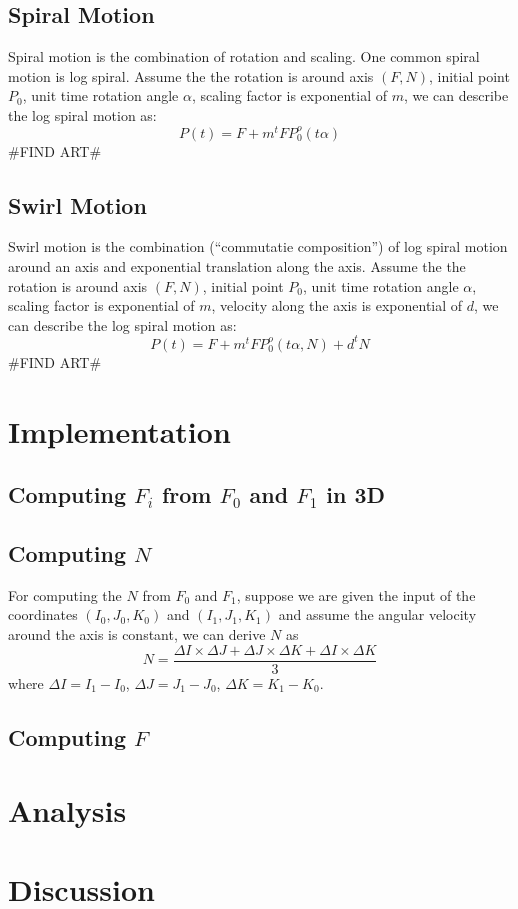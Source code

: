 \documentclass[twoside,11pt]{article}
\begin{document}
\subsection{Spiral Motion}
Spiral motion is the combination of rotation and scaling. One common spiral motion is log spiral. Assume the the rotation is around axis $(F, N)$, initial point $P_0$, unit time rotation angle $\alpha$, scaling factor is exponential of $m$, we can describe the log spiral motion as:
\begin{equation}
P(t) = F + m^t FP_0^o(t\alpha)
\end{equation}
\#FIND ART\#

\subsection{Swirl Motion}
Swirl motion is the combination (``commutatie composition'') of log spiral motion around an axis and exponential translation along the axis. Assume the the rotation is around axis $(F, N)$, initial point $P_0$, unit time rotation angle $\alpha$, scaling factor is exponential of $m$, velocity along the axis is exponential of $d$, we can describe the log spiral motion as:
\begin{equation}
P(t) = F + m^t FP_0^o(t\alpha, N) + d^t N
\end{equation}
\#FIND ART\#

\section{Implementation}

\subsection{Computing $F_i$ from $F_0$ and $F_1$ in 3D}


\subsection{Computing $N$}

For computing the $N$ from $F_0$ and $F_1$, suppose we are given the input of the coordinates $(I_0, J_0, K_0)$ and $(I_1, J_1, K_1)$ and assume the angular velocity around the axis is constant, we can derive $N$ as
\begin{equation}
N = \frac{\Delta I \times \Delta J + \Delta J \times \Delta K + \Delta I \times \Delta K}{3}
\end{equation}
where $\Delta I = I_1 - I_0$, $\Delta J = J_1 - J_0$, $\Delta K = K_1 - K_0$.

\subsection{Computing $F$}


\section{Analysis}


\section{Discussion}




%
%
\end{document}
